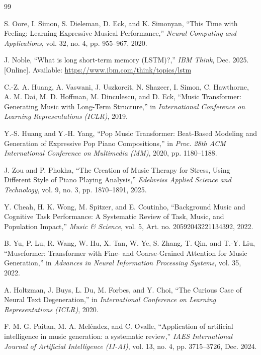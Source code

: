 \documentclass[conference,a4paper]{IEEEtran}
\begin{document}
\begin{thebibliography}{99}

S. Oore, I. Simon, S. Dieleman, D. Eck, and K. Simonyan, ``This Time with Feeling: Learning Expressive Musical Performance,'' \textit{Neural Computing and Applications}, vol. 32, no. 4, pp. 955--967, 2020.

J. Noble,
``What is long short-term memory (LSTM)?,''
\textit{IBM Think}, Dec. 2025. [Online].
Available: \url{https://www.ibm.com/think/topics/lstm}

C.-Z. A. Huang, A. Vaswani, J. Uszkoreit, N. Shazeer, I. Simon, C. Hawthorne, A. M. Dai, M. D. Hoffman, M. Dinculescu, and D. Eck,
``Music Transformer: Generating Music with Long-Term Structure,''
in \textit{International Conference on Learning Representations (ICLR)}, 2019.

Y.-S. Huang and Y.-H. Yang, ``Pop Music Transformer: Beat-Based Modeling and Generation of Expressive Pop Piano Compositions,''
in \textit{Proc. 28th ACM International Conference on Multimedia (MM)}, 2020, pp. 1180--1188.

J. Zou and P. Phokha,
``The Creation of Music Therapy for Stress, Using Different Style of Piano Playing Analysis,''
\textit{Edelweiss Applied Science and Technology}, vol. 9, no. 3, pp. 1870–1891, 2025.

Y. Cheah, H. K. Wong, M. Spitzer, and E. Coutinho,
``Background Music and Cognitive Task Performance: A Systematic Review of Task, Music, and Population Impact,''
\textit{Music \& Science}, vol. 5, Art. no. 20592043221134392, 2022.

B. Yu, P. Lu, R. Wang, W. Hu, X. Tan, W. Ye, S. Zhang, T. Qin, and T.-Y. Liu,
``Museformer: Transformer with Fine- and Coarse-Grained Attention for Music Generation,''
in \textit{Advances in Neural Information Processing Systems}, vol. 35, 2022.

A. Holtzman, J. Buys, L. Du, M. Forbes, and Y. Choi,
``The Curious Case of Neural Text Degeneration,''
in \textit{International Conference on Learning Representations (ICLR)}, 2020.

F. M. G. Paitan, M. A. Meléndez, and C. Ovalle,
``Application of artificial intelligence in music generation: a systematic review,''
\textit{IAES International Journal of Artificial Intelligence (IJ-AI)}, vol. 13, no. 4, pp. 3715--3726, Dec. 2024.


\end{thebibliography}
\end{document}
